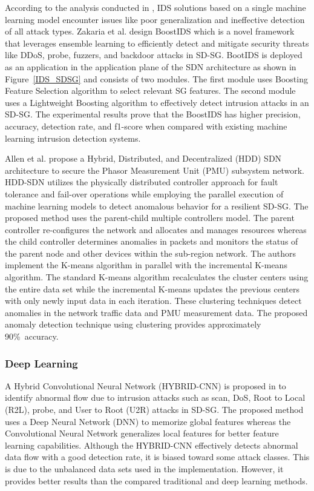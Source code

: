 \documentclass[conference]{IEEEtran}
\begin{document}
According to the analysis conducted in \cite{9843645}, IDS solutions based on a single machine learning model encounter issues like poor generalization and ineffective detection of all attack types. Zakaria et al. design BoostIDS which is a novel framework that leverages ensemble learning to efficiently detect and mitigate security threats like DDoS, probe, fuzzers, and backdoor attacks in SD-SG. BootIDS is deployed as an application in the application plane of the SDN architecture as shown in Figure~\ref{IDS_SDSG} and consists of two modules. The first module uses Boosting Feature Selection algorithm to select relevant SG features. The second module uses a Lightweight Boosting algorithm to effectively detect intrusion attacks in an SD-SG. The experimental results prove that the BoostIDS has higher precision, accuracy, detection rate, and f1-score when compared with existing machine learning intrusion detection systems.

Allen et al. \cite{10.1007/978-3-030-02931-9_7} propose a Hybrid, Distributed, and Decentralized (HDD) SDN architecture to secure the Phasor Measurement Unit (PMU) subsystem network. HDD-SDN utilizes the physically distributed controller approach for fault tolerance and fail-over operations while employing the parallel execution of machine learning models to detect anomalous behavior for a resilient SD-SG. The proposed method uses the parent-child multiple controllers model. The parent controller re-configures the network and allocates and manages resources whereas the child controller determines anomalies in packets and monitors the status of the parent node and other devices within the sub-region network. The authors implement the K-means algorithm in parallel with the incremental K-means algorithm. The standard K-means algorithm recalculates the cluster centers using the entire data set while the incremental K-means updates the previous centers with only newly input data in each iteration. These clustering techniques detect anomalies in the network traffic data and PMU measurement data. The proposed anomaly detection technique using clustering provides approximately 90\%\ accuracy.

\subsubsection{Deep Learning}
A Hybrid Convolutional Neural Network (HYBRID-CNN) is proposed in \cite{Peng} to identify abnormal flow due to intrusion attacks such as scan, DoS, Root to Local (R2L), probe, and User to Root (U2R) attacks in SD-SG. The proposed method uses a Deep Neural Network (DNN) to memorize global features whereas the Convolutional Neural Network generalizes local features for better feature learning capabilities. Although the HYBRID-CNN effectively detects abnormal data flow with a good detection rate, it is biased toward some attack classes. This is due to the unbalanced data sets used in the implementation. However, it provides better results than the compared traditional and deep learning methods. 
\end{document}
